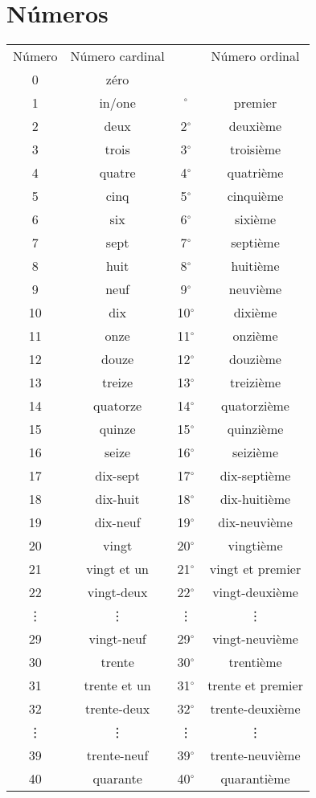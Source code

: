 \section{Números}
\begin{tabular}{cccc}
	Número& Número cardinal&&Número ordinal\\
0&zéro&&\\
	1&in/one&$^\circ$&premier\\
	2&deux&2$^\circ$&deuxième\\
	3&trois&3$^\circ$&troisième\\
	4&quatre&4$^\circ$&quatrième\\
	5&cinq&5$^\circ$&cinquième\\
	6&six&6$^\circ$&sixième\\
	7&sept&7$^\circ$&septième\\
	8&huit&8$^\circ$&huitième\\
	9&neuf&9$^\circ$&neuvième\\
	10&dix&10$^\circ$&dixième\\
	11&onze&11$^\circ$&onzième\\
	12&douze&12$^\circ$&douzième\\
	13&treize&13$^\circ$&treizième\\
	14&quatorze&14$^\circ$&quatorzième\\
	15&quinze&15$^\circ$&quinzième\\
	16&seize&16$^\circ$&seizième\\
	17&dix-sept&17$^\circ$&dix-septième\\
	18&dix-huit&18$^\circ$&dix-huitième\\
	19&dix-neuf&19$^\circ$&dix-neuvième\\
	20&vingt&20$^\circ$&vingtième\\
	21&vingt et un&21$^\circ$&vingt et premier\\
	22&vingt-deux&22$^\circ$&vingt-deuxième\\
	\vdots&\vdots&\vdots&\vdots\\
	29&vingt-neuf&29$^\circ$&vingt-neuvième\\
	30&trente&30$^\circ$&trentième\\
	31&trente et un&31$^\circ$&trente et premier\\
32&trente-deux&32$^\circ$&trente-deuxième\\
	\vdots&\vdots&\vdots&\vdots\\
	39&trente-neuf&39$^\circ$&trente-neuvième\\
	40&quarante&40$^\circ$&quarantième\\

\end{tabular}

